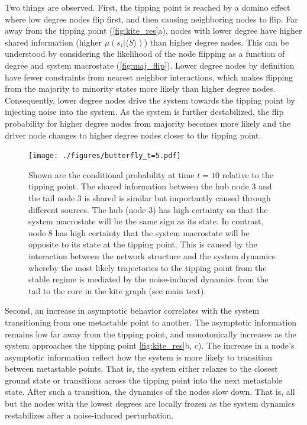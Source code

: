 \documentclass[a4paper, 11pt, twocolumn]{article}
\begin{document}
Two things are observed. First, the tipping point is reached
by a  domino effect where  low degree nodes flip  first, and
then causing  neighboring nodes to  flip. Far away  from the
tipping  point  (\cref{fig:kite_res}{a}),  nodes
with  lower  degree  have higher shared information  (higher
\(\mu(s_i |  \langle S \rangle)\)) than  higher degree nodes. This  can be
understood  by  considering  the   likelihood  of  the  node
flipping  as  a function  of  degree  and system  macrostate
(\cref{fig:maj_flip}).  Lower degree  nodes by
definition  have  fewer  constraints from  nearest  neighbor
interactions,  which makes  flipping  from  the majority  to
minority  states  more  likely  than  higher  degree  nodes.
Consequently, lower  degree nodes  drive the  system towards
the tipping point by injecting noise into the system. As the
system  is further  destabilized, the  flip probability  for
higher degree  nodes from  majority becomes more  likely and
the driver node changes to higher degree nodes closer to the
tipping point.

\begin{figure}[htbp]
\centering
\texttt{[image: ./figures/butterfly\_t=5.pdf]}
\caption{\label{fig:butterfly}Shown are the conditional probability at time \(t=10\) relative to the tipping point. The shared information between the hub node 3 and the tail node 3 is shared is similar but importantly caused through different sources. The hub (node 3) has high certainty on that the system macrostate will be the same sign as its state. In contrast, node 8 has high certainty that the system macrostate will be opposite to its state at the tipping point. This is caused by the interaction between the network structure and the system dynamics whereby the most likely trajectories to the tipping point from the stable regime is mediated by the noise-induced dynamics from the tail to the core in the kite graph (see main text).}
\end{figure}

Second, an  increase in asymptotic behavior  correlates with
the  system  transitioning  from  one  metastable  point  to
another.  The asymptotic  information remains  low far  away
from the  tipping point, and monotonically  increases as the
system       approaches        the       tipping       point
\cref{fig:kite_res}{b,  c}). The  increase in  a
node's asymptotic information reflect how the system is more
likely to transition between metastable points. That is, the
system  either  relaxes  to  the  closest  ground  state  or
transitions  across   the  tipping   point  into   the  next
metastable state.  After such a transition,  the dynamics of
the nodes  slow down. That  is, all  but the nodes  with the
lowest  degrees are  locally frozen  as the  system dynamics
restabilizes after a noise-induced perturbation.
\end{document}
